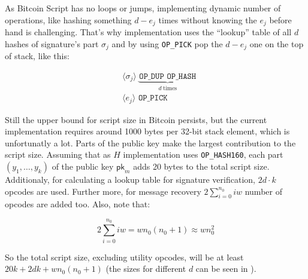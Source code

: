 \documentclass{iacrtrans}
\newcommand{\elem}[1]{\, \langle #1 \rangle \,}
\newcommand{\opcode}[1]{\, \texttt{#1} \,}
\begin{document}
As Bitcoin Script has no loops or jumps, implementing dynamic number
of operations, like hashing something $d - e_j$ times without knowing
the $e_j$ before hand is challenging. That's why implementation uses
the ``lookup'' table of all $d$ hashes of signature's part $\sigma_j$ and
by using \texttt{OP\_PICK} pop the $d - e_j$ one on the top of stack,
like this:

\begin{empheqboxed}
  \begin{align*}
    & \elem{\sigma_j} \underbrace{\opcode{OP\_DUP}
    \opcode{OP\_HASH}}_{d \; \text{times}} \\
    & \elem{e_j} \opcode{OP\_PICK}
  \end{align*}
\end{empheqboxed}

Still the upper bound for script size in Bitcoin persists, but the
current implementation requires around 1000 bytes per 32-bit stack
element, which is unfortunatly a lot. Parts of the public key make the
largest contribution to the script size. Assuming that as $H$
implementation uses \texttt{OP\_HASH160}, each part $(y_1,\dots,y_k)$
of the public key $\mathsf{pk}_{m}$ adds 20 bytes to the total script
size. Additionaly, for calculating a lookup table for signature
verification, $2d \cdot k$ opcodes are used. Further more, for message
recovery $2 \sum_{i = 0}^{n_0} i w$ number of opcodes are added
too. Also, note that:

\begin{equation}
  \label{eq:opcodes-for-recovery-number}
    2 \sum_{i = 0}^{n_0} i w = w n_0 (n_0+1) \approx w n_0^2
\end{equation}

So the total script size, excluding utility opcodes, will be at least
$20k + 2 d k + w n_0 (n_0+1)$ (the sizes for different $d$ can be seen
in ).
\end{document}
